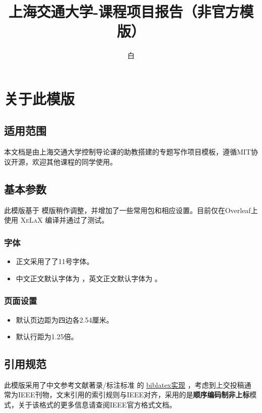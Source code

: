 \documentclass[a4paper,11pt,AutoFakeBold]{ctexart}
\title{\textbf{上海交通大学-课程项目报告（非官方模版）}}
\author{白\fallback{鹡鸰}}
\begin{document}
\maketitle

\section{关于此模版}

\subsection{适用范围}

本文档是由上海交通大学控制导论课的助教搭建的专题写作项目模板，遵循MIT协议开源，欢迎其他课程的同学使用。

\subsection{基本参数}

此模版基于  模版稍作调整，并增加了一些常用包和相应设置。目前仅在Overleaf上使用 \textsc{XeLaX} 编译并通过了测试。

\subsubsection{字体}

\begin{itemize}
    \item 正文采用了了11号字体。
    \item 中文正文默认字体为 ，英文正文默认字体为 。
\end{itemize}

\subsubsection{页面设置}

\begin{itemize}
    \item 默认页边距为四边各2.54厘米。
    \item 默认行距为1.25倍。
    
\end{itemize}

\subsection{引用规范}

此模版采用了中文参考文献著录/标注标准  的 \href{https://github.com/hushidong/biblatex-gb7714-2015?tab=readme-ov-file#jumptotutorial}{biblatex实现} \parencite{gb7714}，考虑到上交投稿通常为IEEE刊物，文末引用的索引规则与IEEE对齐，采用的是\textbf{顺序编码制非上标}模式，关于该格式的更多信息请查阅IEEE官方格式文档。
\end{document}
